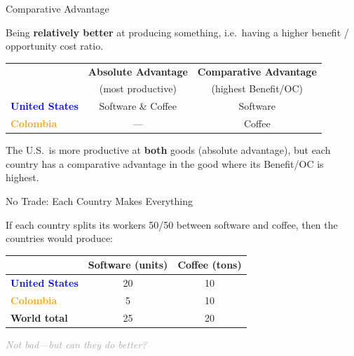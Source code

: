 \documentclass[9pt,english,aspectratio=169]{beamer}
\begin{document}
\begin{frame}{Comparative Advantage}

  \begin{definitionbox}
    Being \textbf{relatively better} at producing something, i.e.\ having a higher benefit / opportunity cost ratio.
  \end{definitionbox}

  \vspace{1.5em}
  \centering
  \begin{tabular}{@{} l c c @{}}
    \toprule
    & \textbf{Absolute Advantage} & \textbf{Comparative Advantage} \\
    & {\small (most productive)} & {\small (highest Benefit/OC)} \\
    \midrule
    \textcolor{blue}{\textbf{United States}} & Software \& Coffee & Software \\[0.3em]
    \textcolor{orange}{\textbf{Colombia}} & --- & Coffee \\
    \bottomrule
  \end{tabular}

  \vspace{1.5em}
  The U.S.\ is more productive at \textbf{both} goods (absolute advantage), but each country has a comparative advantage in the good where its Benefit/OC is highest.

\end{frame}

\begin{frame}{No Trade: Each Country Makes Everything}

  \vspace{0.5em}
  If each country splits its workers 50/50 between software and coffee, then the countries would produce:

  \vspace{1em}
  \centering
  \begin{tabular}{@{} l c c @{}}
    \toprule
    & \textbf{Software (units)} & \textbf{Coffee (tons)} \\
    \midrule
    \textcolor{blue}{\textbf{United States}} & 20 & 10 \\
    \textcolor{orange}{\textbf{Colombia}} & 5 & 10 \\
    \midrule
    \textbf{World total} & 25 & 20 \\
    \bottomrule
  \end{tabular}

  \vspace{1.5em}
  \textcolor{DarkGray}{\textit{Not bad---but can they do better?}}

\end{frame}
\end{document}
